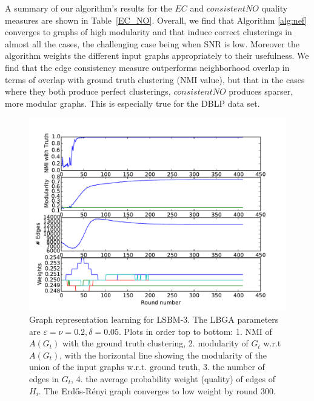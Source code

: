 \documentclass[twoside,twocolumn]{article}
\newcommand{\er}{Erd\H{o}s-R\'{e}nyi }
\begin{document}
A summary of our algorithm's results for the $EC$ and $consistentNO$ quality
measures are shown in Table~\ref{EC_NO}. Overall, we find that Algorithm
\ref{alg:nef} converges to graphs of high modularity and that induce correct
clusterings in almost all the cases, the challenging case being when SNR is
low. Moreover the algorithm weights the different input graphs appropriately to
their usefulness. We find that the edge consistency measure outperforms
neighborhood overlap in terms of overlap with ground truth clustering (NMI
value), but that in the cases where they both produce perfect clusterings,
$consistentNO$ produces sparser, more modular graphs. This is especially true
for the DBLP data set. 

\begin{figure}[t]
\begin{centering}
\includegraphics[width=\columnwidth]{LBMchart.pdf}
\par\end{centering}
\caption{Graph representation learning for LSBM-3. The LBGA parameters are
$\varepsilon=\nu=0.2, \delta=0.05$. Plots in order top to bottom: 1. NMI of
$A(G_t)$ with the ground truth clustering, 2. modularity of $G_t$ w.r.t
$A(G_t)$, with the horizontal line showing the modularity of the union of the
input graphs w.r.t. ground truth, 3. the number of edges in $G_t$, 4.  the
average probability weight (quality) of edges of $H_i$.  The \er graph
converges to low weight by round 300.} 
\label{fig:local-sbm} 
\end{figure}
\end{document}
